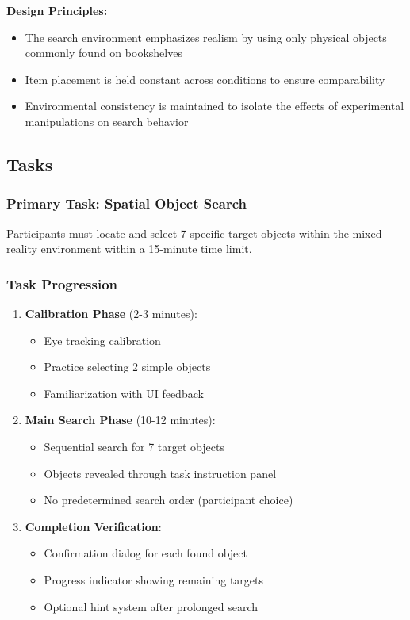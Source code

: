 \documentclass[12pt,letterpaper]{article}
\begin{document}
\textbf{Design Principles:}
\begin{itemize}
    \item The search environment emphasizes realism by using only physical objects commonly found on bookshelves
    \item Item placement is held constant across conditions to ensure comparability
    \item Environmental consistency is maintained to isolate the effects of experimental manipulations on search behavior
\end{itemize}

\subsection{Tasks}

\subsubsection{Primary Task: Spatial Object Search}
Participants must locate and select 7 specific target objects within the mixed reality environment within a 15-minute time limit.

\subsubsection{Task Progression}
\begin{enumerate}
    \item \textbf{Calibration Phase} (2-3 minutes):
    \begin{itemize}
        \item Eye tracking calibration
        \item Practice selecting 2 simple objects
        \item Familiarization with UI feedback
    \end{itemize}
    
    \item \textbf{Main Search Phase} (10-12 minutes):
    \begin{itemize}
        \item Sequential search for 7 target objects
        \item Objects revealed through task instruction panel
        \item No predetermined search order (participant choice)
    \end{itemize}
    
    \item \textbf{Completion Verification}:
    \begin{itemize}
        \item Confirmation dialog for each found object
        \item Progress indicator showing remaining targets
        \item Optional hint system after prolonged search
    \end{itemize}
\end{enumerate}
\end{document}
